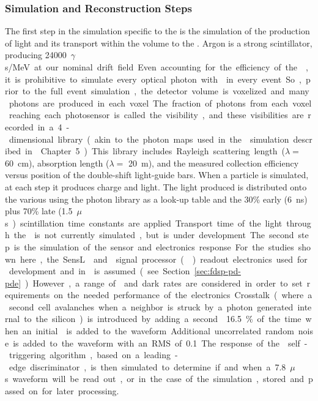 \subsubsection{Simulation and Reconstruction Steps} 

The first step in the simulation specific to the  is the simulation of the production of light and its transport within the volume to the . Argon is a strong scintillator, producing \SI{24000}{$\gamma$s/MeV} at our nominal drift field. Even accounting for the efficiency of the , it is prohibitive to simulate every optical photon with  in every event. So, prior to the full event simulation, the detector volume is voxelized and many photons are produced in each voxel. The fraction of photons from each voxel reaching each photosensor is called the visibility, and these visibilities are recorded in a 4-dimensional library (akin to the photon maps used in the  simulation described in \voltitledp~Chapter~5).
This library includes Rayleigh scattering length ($\lambda=$ \SI{60}{cm}\cite{Grace:2015yta}), absorption length ($\lambda=$ \SI{20}{m}), and the measured collection efficiency versus position of the double-shift light-guide bars. When a particle is simulated, at each step it produces charge and light. The light produced is distributed onto the various  using the photon library as a look-up table and the 30\% early (\SI{6}{ns}) plus 70\% late (\SI{1.5}{$\mu$s}) scintillation time constants are applied. Transport time of the light through the \lar is not currently simulated, but is under development.

The second step is the simulation of the sensor and electronics response. For the studies shown here, the SensL  and  signal processor () readout electronics used for  development and in  is assumed (see Section~\ref{sec:fdsp-pd-pde}). However, a range of  and dark rates are considered in order to set requirements on the needed performance of the electronics.
Crosstalk (where a second cell avalanches when a neighbor is struck by a photon generated internal to the silicon) is introduced by adding a second \phel \num{16.5}\% of the time when an initial \phel is added to the waveform. Additional uncorrelated random noise is added to the waveform with an RMS of %
\SI{0.1}{\phel{}}. The response of the  self-triggering algorithm, based on a leading-edge discriminator, is then simulated to determine if and when a \SI{7.8}{$\mu$s} waveform will be read out, or in the case of the simulation, %
stored and passed on for later processing.

